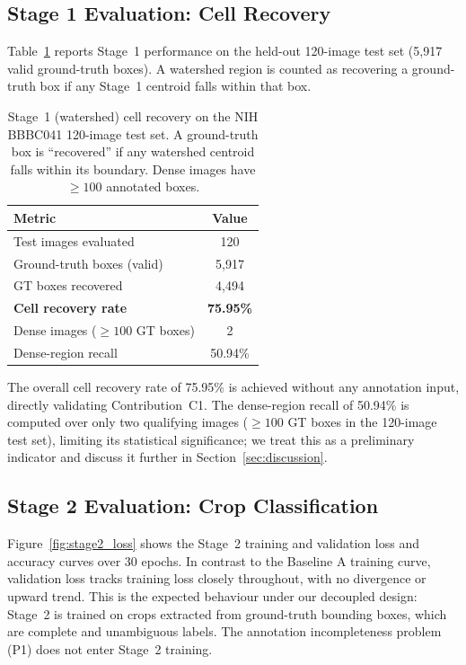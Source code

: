 \documentclass[10pt,twocolumn]{article}
\begin{document}
\subsection{Stage 1 Evaluation: Cell Recovery}
\label{ssec:stage1_results}

Table~\ref{tab:stage1} reports Stage~1 performance on the held-out
120-image test set (5,917 valid ground-truth boxes). A watershed region
is counted as recovering a ground-truth box if any Stage~1 centroid falls
within that box.

\begin{table}[H]
\centering
\small
\caption{Stage~1 (watershed) cell recovery on the NIH BBBC041 120-image
  test set. A ground-truth box is ``recovered'' if any watershed centroid
  falls within its boundary. Dense images have $\geq 100$ annotated boxes.}
\label{tab:stage1}
\renewcommand{\arraystretch}{1.15}
\begin{tabular}{lc}
\toprule
\textbf{Metric} & \textbf{Value} \\
\midrule
Test images evaluated              & 120 \\
Ground-truth boxes (valid)         & 5,917 \\
GT boxes recovered                 & 4,494 \\
\textbf{Cell recovery rate}        & \textbf{75.95\%} \\
\midrule
Dense images ($\geq 100$ GT boxes) & 2 \\
Dense-region recall                & 50.94\% \\
\bottomrule
\end{tabular}
\end{table}

The overall cell recovery rate of 75.95\% is achieved without any
annotation input, directly validating Contribution~C1. The dense-region
recall of 50.94\% is computed over only two qualifying images ($\geq 100$
GT boxes in the 120-image test set), limiting its statistical significance;
we treat this as a preliminary indicator and discuss it further in
Section~\ref{sec:discussion}.

\subsection{Stage 2 Evaluation: Crop Classification}
\label{ssec:stage2_results}

Figure~\ref{fig:stage2_loss} shows the Stage~2 training and validation
loss and accuracy curves over 30 epochs. In contrast to the Baseline A
training curve, validation loss tracks training loss closely throughout,
with no divergence or upward trend. This is the expected behaviour under
our decoupled design: Stage~2 is trained on crops extracted from
ground-truth bounding boxes, which are complete and unambiguous labels.
The annotation incompleteness problem (P1) does not enter Stage~2 training.
\end{document}
